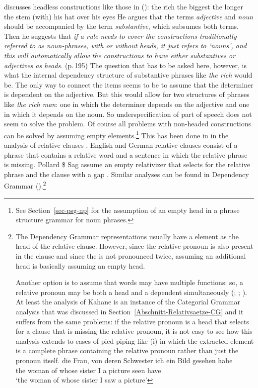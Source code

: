 \citet[Section~4.E]{Hudson80a} discusses headless constructions like those in ():
\eal
\ex the rich
\ex the biggest
\ex the longer the stem
\ex (with) his hat over his eyes
\zl
He argues that the terms \emph{adjective} and \emph{noun} should be accompanied by the term
\emph{substantive}, which subsumes both terms. Then he suggests that \emph{if a rule needs to cover
  the constructions traditionally referred to as noun-phrases, with or without heads, it just
  refers to `nouns', and this will automatically allow the constructions to have either
substantives or adjectives as heads.} (p.\,195) The question that has to be asked here, however, is
what the internal dependency structure of substantive phrases like \emph{the rich} would be. The
only way to connect the items seems to be to assume that the determiner is dependent on the
adjective. But this would allow for two structures of phrases like \emph{the rich man}: one in which
the determiner depends on the adjective and one in which it depends on the noun. So
underspecification of part of speech does not seem to solve the problem. Of course all problems with
non-headed constructions can be solved by assuming empty elements.\footnote{%
 See Section~\ref{sec-psg-np} for the assumption of an empty head in a phrase structure grammar for
 noun phrases.}
This has been done in \hpsg in
the analysis of relative clauses \citep[Chapter~5]{ps2}. English and German relative clauses consist of a
phrase that contains a relative word and a sentence in which the relative phrase is missing. Pollard
\$ Sag assume an empty relativizer that selects for the relative phrase and the clause with a
gap \citep[--217]{ps2}. Similar analyses can be found in Dependency Grammar (\citealp[]{Eroms2000a}).\footnote{
  The Dependency Grammar representations usually have a  element as the head of the relative
  clause. However, since the relative pronoun is also present in the clause and since the 
  is not pronounced twice, assuming an additional  head is basically assuming an empty
  head. 

  Another option is to assume that words may have multiple functions: so, a relative pronoun may be
  both a head and a dependent simultaneously (\citealp[Chapter 246, §8--11]{Tesniere2015a-u}; \citealp[\page xlvi]{OK2015a}; \citealp[--130]{Kahane2009a}). At least the analysis of Kahane is an instance of the Categorial
  Grammar analysis that was discussed in Section~\ref{Abschnitt-Relativsaetze-CG} and it suffers from the same problems: if the
  relative pronoun is a head that selects for a clause that is missing the relative pronoun, it is not easy to see how
  this analysis extends to cases of pied-piping like (i) in which the extracted element is a complete phrase
  containing the relative pronoun rather than just the pronoun itself.
\ea
\gll die Frau, von deren Schwester ich ein Bild gesehen habe\\
     the woman of whose sister I a picture seen have\\
\glt `the woman of whose sister I saw a picture'
\zlast
}
